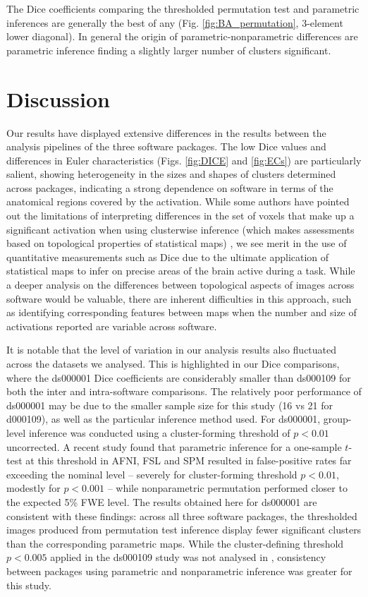 The Dice coefficients comparing the thresholded permutation test and parametric inferences are generally the best of any (Fig. \ref{fig:BA_permutation}, 3-element lower diagonal). In general the origin of parametric-nonparametric differences are parametric inference finding a slightly larger number of clusters significant.

\section{Discussion}

Our results have displayed extensive differences in the results between the analysis pipelines of the three software packages. The low Dice values and differences in Euler characteristics (Figs. \ref{fig:DICE} and \ref{fig:ECs}) are particularly salient, showing heterogeneity in the sizes and shapes of clusters determined across packages, indicating a strong dependence on software in terms of the anatomical regions covered by the activation. While some authors have pointed out the limitations of interpreting differences in the set of voxels that make up a significant activation when using clusterwise inference (which makes assessments based on topological properties of statistical maps) \citep{Chumbley2009-ce}, we see merit in the use of quantitative measurements such as Dice due to the ultimate application of statistical maps to infer on precise areas of the brain active during a task. While a deeper analysis on the differences between topological aspects of images across software would be valuable, there are inherent difficulties in this approach, such as identifying corresponding features between maps when the number and size of activations reported are variable across software.

It is notable that the level of variation in our analysis results also fluctuated across the datasets we analysed. This is highlighted in our Dice comparisons, where the ds000001 Dice coefficients are considerably smaller than ds000109 for both the inter and intra-software comparisons. The relatively poor performance of ds000001 may be due to the smaller sample size for this study (16 vs 21 for d000109), as well as the particular inference method used. For ds000001, group-level inference was conducted using a cluster-forming threshold of $p < 0.01$ uncorrected. A recent study \citep{Eklund2016-ak} found that parametric inference for a one-sample $t$-test at this threshold in AFNI, FSL and SPM resulted in false-positive rates far exceeding the nominal level -- severely for cluster-forming threshold $p < 0.01$, modestly for $p < 0.001$ -- while nonparametric permutation performed closer to the expected 5\% FWE level. The results obtained here for ds000001 are consistent with these findings: across all three software packages, the thresholded images produced from permutation test inference display fewer significant clusters than the corresponding parametric maps. While the cluster-defining threshold $p < 0.005$ applied in the ds000109 study was not analysed in \citeauthor{Eklund2016-ak}, consistency between packages using parametric and nonparametric inference was greater for this study.

